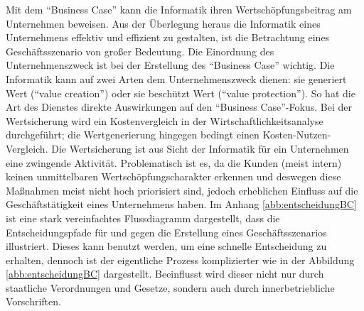 Mit dem \enquote{Business Case} kann die Informatik ihren Wertschöpfungsbeitrag am Unternehmen beweisen. Aus der Überlegung heraus die Informatik eines Unternehmens effektiv und effizient zu gestalten, ist die Betrachtung eines Geschäftsszenario von großer Bedeutung. Die Einordnung des Unternehmenszweck ist bei der Erstellung des \enquote{Business Case} wichtig. Die Informatik kann auf zwei Arten dem Unternehmenszweck dienen: sie generiert Wert (\enquote{value creation}) oder sie beschützt Wert (\enquote{value protection}). So hat die Art des Dienstes direkte Auswirkungen auf den \enquote{Business Case}-Fokus. Bei der Wertsicherung wird ein Kostenvergleich in der Wirtschaftlichkeitsanalyse durchgeführt; die Wertgenerierung hingegen bedingt einen Kosten-Nutzen-Vergleich. Die Wertsicherung ist aus Sicht der Informatik für ein Unternehmen eine zwingende Aktivität. Problematisch ist es, da die Kunden (meist intern) keinen unmittelbaren Wertschöpfungscharakter erkennen und deswegen diese Maßnahmen meist nicht hoch priorisiert sind, jedoch erheblichen Einfluss auf die Geschäftstätigkeit eines Unternehmens haben.\autocite[vgl.][S.27]{brugger_it_2009} Im Anhang \vref{abb:entscheidungBC} ist eine stark vereinfachtes Flussdiagramm dargestellt, dass die Entscheidungspfade für und gegen die Erstellung eines Geschäftsszenarios illustriert. Dieses kann benutzt werden, um eine schnelle Entscheidung zu erhalten, dennoch ist der eigentliche Prozess komplizierter wie in der Abbildung \vref{abb:entscheidungBC} dargestellt. Beeinflusst wird dieser nicht nur durch staatliche Verordnungen und Gesetze, sondern auch durch innerbetriebliche Vorschriften. 
\par
